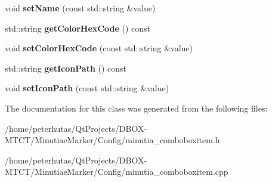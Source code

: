 \begin{DoxyCompactItemize}
void {\bfseries set\+Name} (const std\+::string \&value)
\item 
\mbox{\label{class_minutia_combobox_item_a290efe7ad6a3c11ee5957c26abbb774a}} 
std\+::string {\bfseries get\+Color\+Hex\+Code} () const
\item 
\mbox{\label{class_minutia_combobox_item_aa684c7b1ce3e0e7ba2787d45de63a130}} 
void {\bfseries set\+Color\+Hex\+Code} (const std\+::string \&value)
\item 
\mbox{\label{class_minutia_combobox_item_a93beee0524dae222116b6717c16eda44}} 
std\+::string {\bfseries get\+Icon\+Path} () const
\item 
\mbox{\label{class_minutia_combobox_item_adf4448ab53245fdab4a987bb4456f919}} 
void {\bfseries set\+Icon\+Path} (const std\+::string \&value)
\end{DoxyCompactItemize}


The documentation for this class was generated from the following files\+:\begin{DoxyCompactItemize}
\item 
/home/peterhutas/\+Qt\+Projects/\+D\+B\+O\+X-\/\+M\+T\+C\+T/\+Minutiae\+Marker/\+Config/minutia\+\_\+comboboxitem.\+h\item 
/home/peterhutas/\+Qt\+Projects/\+D\+B\+O\+X-\/\+M\+T\+C\+T/\+Minutiae\+Marker/\+Config/minutia\+\_\+comboboxitem.\+cpp\end{DoxyCompactItemize}
